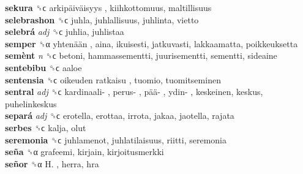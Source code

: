 \textbf{sekura} ␝ϲ   arkipäiväisyys , kiihkottomuus, maltillisuus  \\
\textbf{selebrashon} ␝ϲ  juhla, juhlallisuus, juhlinta, vietto  \\
\textbf{selebrá} \emph{adj}  ␝ϲ  juhlia, juhlistaa  \\
\textbf{semper} ␝α   yhtenään , aina, ikuisesti, jatkuvasti, lakkaamatta, poikkeuksetta  \\
\textbf{semènt} \emph{n}  ␝ϲ  betoni, hammassementti, juurisementti, sementti, sideaine  \\
\textbf{sentebibu} ␝ϲ  aaloe  \\
\textbf{sentensia} ␝ϲ   oikeuden ratkaisu , tuomio, tuomitseminen  \\
\textbf{sentral} \emph{adj}  ␝ϲ   kardinaali- ,  perus- ,  pää- ,  ydin- , keskeinen, keskus, puhelinkeskus  \\
\textbf{separá} \emph{adj}  ␝ϲ  erotella, erottaa, irrota, jakaa, jaotella, rajata  \\
\textbf{serbes} ␝ϲ  kalja, olut  \\
\textbf{seremonia} ␝ϲ  juhlamenot, juhlatilaisuus, riitti, seremonia  \\
\textbf{seña} ␝α  grafeemi, kirjain, kirjoitusmerkki  \\
\textbf{señor} ␝α   H. , herra, hra  \\
